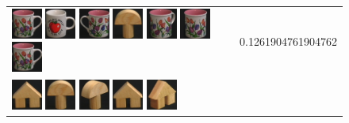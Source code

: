 \begin{figure}[tbp]
\begin{center}
\begin{tabular}{m{11cm} | m{3cm} |}
\includegraphics[width=1cm]{coil/beeld-6.eps}
\includegraphics[width=1cm]{coil/beeld-36.eps}
\includegraphics[width=1cm]{coil/beeld-7.eps}
\includegraphics[width=1cm]{coil/beeld-0.eps}
\includegraphics[width=1cm]{coil/beeld-9.eps}
\includegraphics[width=1cm]{coil/beeld-8.eps}
\includegraphics[width=1cm]{coil/beeld-6.eps}
& {\scriptsize 0.1261904761904762}
\\
\includegraphics[width=1cm]{coil/beeld-42.eps}
\includegraphics[width=1cm]{coil/beeld-0.eps}
\includegraphics[width=1cm]{coil/beeld-3.eps}
\includegraphics[width=1cm]{coil/beeld-42.eps}
\includegraphics[width=1cm]{coil/beeld-45.eps}

\end{tabular}
\end{center}
\end{figure}
